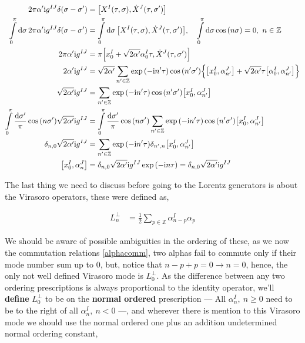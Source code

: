 \begin{align*}
    2\pi\alpha'\im g^{IJ}\delta\qty(\sigma-\sigma')&=\comm{X^I\qty(\tau,\sigma)}{{\dot X}^J\qty(\tau,\sigma')}\\
    \int\limits_0^\pi\dd{\sigma}2\pi\alpha'\im g^{IJ}\delta\qty(\sigma-\sigma')&=\int\limits_0^\pi\dd{\sigma}\comm{X^I\qty(\tau,\sigma)}{{\dot X}^J\qty(\tau,\sigma')},\ \ \ \int\limits_0^\pi\dd{\sigma}\cos\qty(n\sigma)=0,\ n\in\mathbb Z\\
    2\pi\alpha'\im g^{IJ}&=\pi\comm{x_0^I+\sqrt{2\alpha'}\alpha_0^I\tau}{{\dot X}^J\qty(\tau,\sigma')}\\
    2\alpha'\im g^{IJ}&=\sqrt{2\alpha'}\sum\limits_{n'\in\mathbb Z}\exp\qty(-\im n'\tau)\cos\qty(n'\sigma')\qty{\comm{x_0^I}{\alpha_{n'}^J}+\sqrt{2\alpha'}\tau\comm{\alpha_0^I}{\alpha_{n'}^J}}\\
    \sqrt{2\alpha'}\im g^{IJ}&=\sum\limits_{n'\in\mathbb Z}\exp\qty(-\im n'\tau)\cos\qty(n'\sigma')\comm{x_0^I}{\alpha_{n'}^J}\\
    \int\limits_0^\pi\frac{\dd{\sigma'}}{\pi}\cos\qty(n\sigma')\sqrt{2\alpha'}\im g^{IJ}&=\int\limits_0^\pi\frac{\dd{\sigma'}}{\pi}\cos\qty(n\sigma')\sum\limits_{n'\in\mathbb Z}\exp\qty(-\im n'\tau)\cos\qty(n'\sigma')\comm{x_0^I}{\alpha_{n'}^J}\\
    \delta_{n,0}\sqrt{2\alpha'}\im g^{IJ}&=\sum\limits_{n'\in\mathbb Z}\exp\qty(-\im n'\tau)\delta_{n',n}\comm{x_0^I}{\alpha_{n'}^J}\\
    \comm{x_0^I}{\alpha_{n}^J}&=\delta_{n,0}\sqrt{2\alpha'}\im g^{IJ}\exp\qty(-\im n\tau)=\delta_{n,0}\sqrt{2\alpha'}\im g^{IJ}
\end{align*}

The last thing we need to discuss before going to the Lorentz generators is about the Virasoro operators, these were defined as,

\begin{align*}
    L^\perp_n&=\frac12\sum\limits_{p\in\mathbb Z}\alpha_{n-p}^I\alpha_{p}
\end{align*}

We should be aware of possible ambiguities in the ordering of these, as we now the commutation relations \ref{alphacomm}, two alphas fail 
to commute only if their mode number sum up to $0$, but, notice that $n-p+p=0\rightarrow n=0$, hence, the only not well defined Virasoro mode is 
$L^\perp_0$. As the difference between any two ordering prescriptions is always proportional to the identity operator, we'll \textbf{define} $L^\perp_0$ 
to be on the \textbf{normal ordered} prescription --- All $\alpha_n^I,\ n\geq 0$ need to be to the right of all $\alpha_n^I,\ n<0$ ---, and wherever there is 
mention to this Virasoro mode we should use the normal ordered one plus an addition undetermined normal ordering constant,

